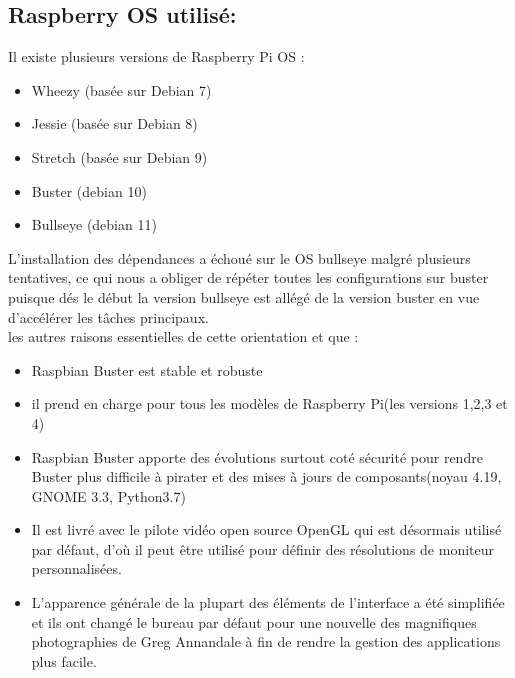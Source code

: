  \subsection{Raspberry OS utilisé: }
 Il existe plusieurs versions de Raspberry Pi OS :
\begin{itemize}
    \item Wheezy (basée sur Debian 7)
    \item Jessie (basée sur Debian 8)
    \item Stretch (basée sur Debian 9)
    \item Buster (debian 10)
    \item Bullseye (debian 11)
\end{itemize}
L'installation des dépendances a échoué sur le OS bullseye malgré plusieurs tentatives, ce qui nous a obliger de répéter  toutes les configurations  sur buster puisque dés le début la version bullseye est allégé de la version buster en vue d'accélérer les tâches principaux. \\
les autres raisons essentielles de cette orientation et que :\\
\begin{itemize}
    \item Raspbian Buster est stable et robuste 
    \item  il prend en charge pour tous les modèles de Raspberry Pi(les versions 1,2,3 et 4)
    \item  Raspbian Buster apporte des évolutions surtout coté sécurité  pour rendre Buster plus difficile à pirater et des mises à jours de composants(noyau 4.19, GNOME 3.3, Python3.7)
    
    \item Il est livré avec  le pilote vidéo open source OpenGL qui est désormais utilisé par défaut, d'où il peut  être utilisé pour définir des résolutions de moniteur personnalisées.
    \item L'apparence générale de la plupart des éléments de l'interface a été simplifiée et ils ont changé le bureau par défaut pour une nouvelle des magnifiques photographies de Greg Annandale à fin de rendre la gestion des applications plus facile.
    
\end{itemize}

